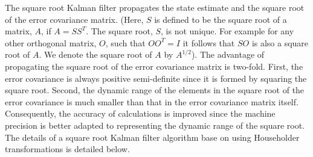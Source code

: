 	The square root Kalman filter propagates the
state estimate and the square root of the error
covariance matrix.  (Here, $S$ is defined to be the square
root of a matrix, $A$, if $A=SS^T$.  The square root, $S$, is
not unique.  For example for any other orthogonal matrix, $O$,
such that $OO^T=I$ it follows that $SO$ is also a square root of $A$.
We denote the square root of $A$ by $A^{1/2}$).
The advantage of propagating the square root of the error covariance
matrix is two-fold.  First, the 
error covariance is always positive semi-definite since
it is formed by squaring the square root.  Second,
the dynamic range of the elements in the square
root of the error covariance is much smaller than
that in the error covariance matrix itself.  Consequently,
the accuracy of calculations is improved since the machine
precision is better adapted to representing the dynamic range
of the square root.  The details of a square root Kalman 
filter algorithm base on using
Householder transformations is detailed below.

